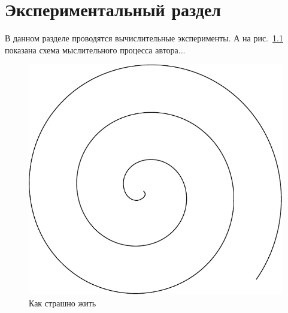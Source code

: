 \chapter{Экспериментальный раздел}
\label{cha:research}

В данном разделе проводятся вычислительные эксперименты.
А на рис.~\ref{fig:spire01} показана схема мыслительного процесса автора...

\begin{figure}
  \centering
  \includegraphics[width=\textwidth]{inc/img/pic01}
  \caption{Как страшно жить}
  \label{fig:spire01}
\end{figure}


